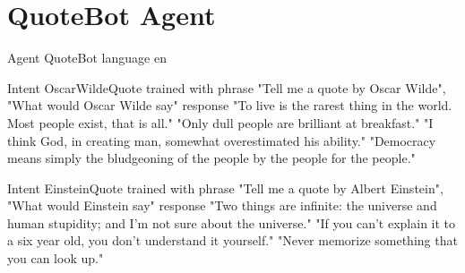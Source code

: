 \section{QuoteBot Agent}
\label{QuoteBot Agent DSL}

\begin{DSL}
Agent QuoteBot
  language en
  
  Intent OscarWildeQuote
    trained with phrase
      "Tell me a quote by Oscar Wilde",
      "What would Oscar Wilde say"
    response
      "To live is the rarest thing in the world. 
        Most people exist, that is all."
      "Only dull people are brilliant at breakfast."
      "I think God, in creating man,
        somewhat overestimated his ability."
      "Democracy means simply the bludgeoning of the people
        by the people for the people."
      
  Intent EinsteinQuote
    trained with phrase
      "Tell me a quote by Albert Einstein",
      "What would Einstein say"
    response
      "Two things are infinite: the universe and
        human stupidity; and I'm not sure about the universe."
      "If you can't explain it to a six year old,
        you don't understand it yourself."
      "Never memorize something that you can look up."
\end{DSL}